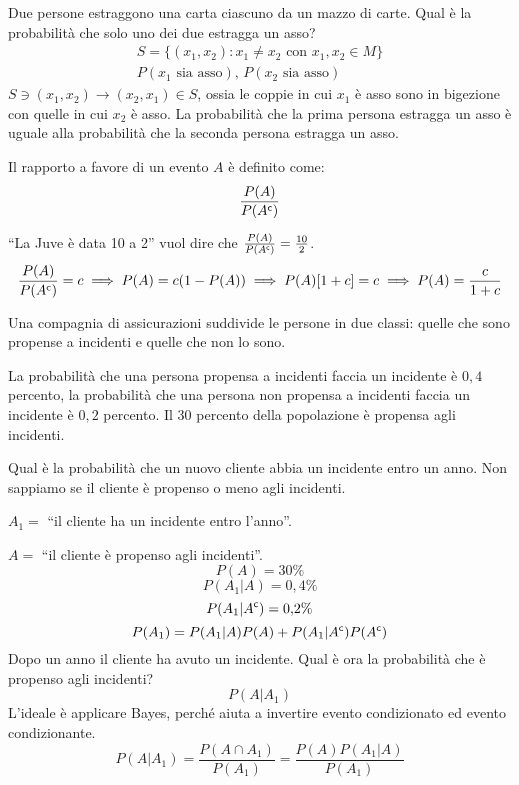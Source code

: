 \begin{exmp}
Due persone estraggono una carta ciascuno da un mazzo di carte. Qual \`e la probabilit\`a che solo uno dei due estragga un asso?
\begin{gather*}
S = \{ (x_1, x_2) : x_1 \neq x_2 \text{ con } x_1, x_2 \in M \} \\
P(x_1 \text{ sia asso}), \, P(x_2 \text{ sia asso})
\end{gather*}
$S \ni (x_1, x_2) \to (x_2, x_1) \in S$, ossia le coppie in cui $x_1$ \`e asso sono in bigezione con quelle in cui $x_2$ \`e asso. La probabilit\`a che la prima persona estragga un asso \`e uguale alla probabilit\`a che la seconda persona estragga un asso.
\end{exmp}

\begin{defn}
Il rapporto a favore di un evento $A$ \`e definito come:
\[
\frac{P(A)}{P(A^{\mathsf{c}})}
\]
\end{defn}
\begin{exmp}
``La Juve \`e data 10 a 2'' vuol dire che $\frac{P(A)}{P(A^{\mathsf{c}})} = \frac{10}{2}$.
\[
\frac{P(A)}{P(A^{\mathsf{c}})} = c \implies P(A) = c (1 - P(A)) \implies P(A) [1 + c] = c \implies P(A) = \frac{c}{1 + c}
\]
\end{exmp}

\begin{exmp}
Una compagnia di assicurazioni suddivide le persone in due classi: quelle che sono propense a incidenti e quelle che non lo sono.

La probabilit\`a che una persona propensa a incidenti faccia un incidente \`e $0{,}4$ percento, la probabilit\`a che una persona non propensa a incidenti faccia un incidente \`e $0{,}2$ percento. Il 30 percento della popolazione \`e propensa agli incidenti.

Qual \`e la probabilit\`a che un nuovo cliente abbia un incidente entro un anno. Non sappiamo se il cliente \`e propenso o meno agli incidenti.

$A_1 = $ ``il cliente ha un incidente entro l'anno''.

$A = $ ``il cliente \`e propenso agli incidenti''.
\[
P(A) = 30 \%
\]
\[
P(A_1 | A) = 0{,}4 \%
\]
\[
P(A_1 | A^{\mathsf{c}}) = 0{,}2 \%
\]
\[
P(A_1) = P(A_1 | A) P(A) + P(A_1 | A^{\mathsf{c}}) P(A^{\mathsf{c}})
\]
Dopo un anno il cliente ha avuto un incidente. Qual \`e ora la probabilit\`a che \`e propenso agli incidenti?
\[
P(A | A_1)
\]
L'ideale \`e applicare Bayes, perch\'e aiuta a invertire evento condizionato ed evento condizionante.
\[
P(A | A_1) = \frac{P(A \cap A_1)}{P(A_1)} = \frac{P(A) P(A_1 | A)}{P(A_1)}
\]
\end{exmp}

